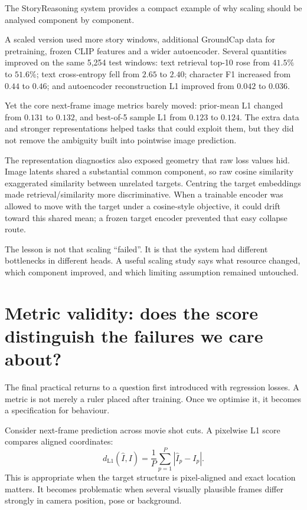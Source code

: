 \begin{architecturebox}
The StoryReasoning system provides a compact example of why scaling should be analysed component by component.

A scaled version used more story windows, additional GroundCap data for pretraining, frozen CLIP features and a wider autoencoder. Several quantities improved on the same 5,254 test windows: text retrieval top-10 rose from \(41.5\%\) to \(51.6\%\); text cross-entropy fell from \(2.65\) to \(2.40\); character F1 increased from \(0.44\) to \(0.46\); and autoencoder reconstruction L1 improved from \(0.042\) to \(0.036\).

Yet the core next-frame image metrics barely moved: prior-mean L1 changed from \(0.131\) to \(0.132\), and best-of-5 sample L1 from \(0.123\) to \(0.124\). The extra data and stronger representations helped tasks that could exploit them, but they did not remove the ambiguity built into pointwise image prediction.

The representation diagnostics also exposed geometry that raw loss values hid. Image latents shared a substantial common component, so raw cosine similarity exaggerated similarity between unrelated targets. Centring the target embeddings made retrieval/similarity more discriminative. When a trainable encoder was allowed to move with the target under a cosine-style objective, it could drift toward this shared mean; a frozen target encoder prevented that easy collapse route.

The lesson is not that scaling ``failed''. It is that the system had different bottlenecks in different heads. A useful scaling study says what resource changed, which component improved, and which limiting assumption remained untouched.
\end{architecturebox}

\section{Metric validity: does the score distinguish the failures we care about?}

The final practical returns to a question first introduced with regression losses. A metric is not merely a ruler placed after training. Once we optimise it, it becomes a specification for behaviour.

Consider next-frame prediction across movie shot cuts. A pixelwise L1 score compares aligned coordinates:
\[
  d_{\mathrm{L1}}(\hat{I},I)
  = \frac{1}{P}\sum_{p=1}^{P}|\hat{I}_p-I_p|.
\]
This is appropriate when the target structure is pixel-aligned and exact location matters. It becomes problematic when several visually plausible frames differ strongly in camera position, pose or background.

